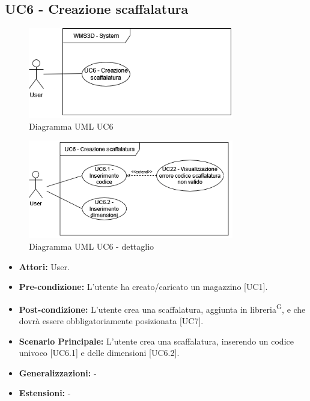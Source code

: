 \subsection{UC6 - Creazione scaffalatura}
\begin{figure}[H]
  \centering
  \includegraphics[width=0.8\textwidth]{UC_diagrams_1-10/UC6_sys.drawio.png}
   \caption{Diagramma UML UC6}
\end{figure}
\begin{figure}[H]
  \centering
  \includegraphics[width=0.8\textwidth]{UC_diagrams_1-10/UC6.drawio.png}
   \caption{Diagramma UML UC6 - dettaglio}
\end{figure}
\begin{itemize}
    \item \textbf{Attori:} User.
    \item \textbf{Pre-condizione:}  L'utente ha creato/caricato un magazzino [UC1].
    \item \textbf{Post-condizione:} L'utente crea una scaffalatura, aggiunta in libreria\textsuperscript{G}, e che dovrà essere obbligatoriamente posizionata [UC7].
    \item \textbf{Scenario Principale:}  L'utente crea una scaffalatura, inserendo un codice univoco [UC6.1] e delle dimensioni [UC6.2].
    \item \textbf{Generalizzazioni:} -
    \item \textbf{Estensioni:} -
\end{itemize}


